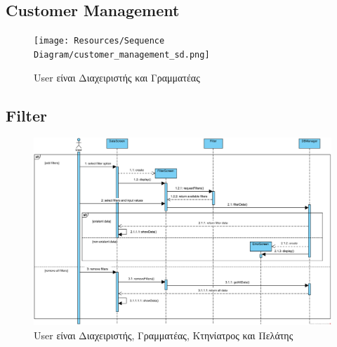 \documentclass[12pt,a4paper,twoside]{book}
\begin{document}
\subsection{Customer Management}
\begin{figure}[H]
    \centering
    \texttt{[image: Resources/Sequence Diagram/customer\_management\_sd.png]}
    \caption{User είναι Διαχειριστής και Γραμματέας}\label{fig:sequence-customer-management}
\end{figure}

\subsection{Filter}
\begin{figure}[H]
    \centering
    \includegraphics[width=\textwidth]{Resources/Sequence Diagram/filter_sd.png}
    \caption{User είναι Διαχειριστής, Γραμματέας, Κτηνίατρος και Πελάτης}\label{fig:sequence-filter}
\end{figure}
\end{document}
